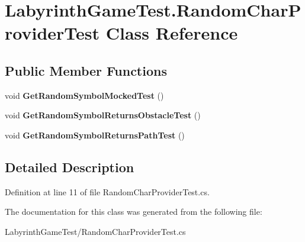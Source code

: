 \hypertarget{class_labyrinth_game_test_1_1_random_char_provider_test}{\section{Labyrinth\+Game\+Test.\+Random\+Char\+Provider\+Test Class Reference}
\label{class_labyrinth_game_test_1_1_random_char_provider_test}
}
\subsection*{Public Member Functions}
\begin{DoxyCompactItemize}
\item 
\hypertarget{class_labyrinth_game_test_1_1_random_char_provider_test_ae3c37381f1e88bb204c252bc4d61c98e}{void {\bfseries Get\+Random\+Symbol\+Mocked\+Test} ()}\label{class_labyrinth_game_test_1_1_random_char_provider_test_ae3c37381f1e88bb204c252bc4d61c98e}

\item 
\hypertarget{class_labyrinth_game_test_1_1_random_char_provider_test_a4b3beecdafebbced77fb01116b023750}{void {\bfseries Get\+Random\+Symbol\+Returns\+Obstacle\+Test} ()}\label{class_labyrinth_game_test_1_1_random_char_provider_test_a4b3beecdafebbced77fb01116b023750}

\item 
\hypertarget{class_labyrinth_game_test_1_1_random_char_provider_test_a28dafef4f81ce5d13f0bc36ac7350bdb}{void {\bfseries Get\+Random\+Symbol\+Returns\+Path\+Test} ()}\label{class_labyrinth_game_test_1_1_random_char_provider_test_a28dafef4f81ce5d13f0bc36ac7350bdb}

\end{DoxyCompactItemize}


\subsection{Detailed Description}


Definition at line 11 of file Random\+Char\+Provider\+Test.\+cs.



The documentation for this class was generated from the following file\+:\begin{DoxyCompactItemize}
\item 
Labyrinth\+Game\+Test/Random\+Char\+Provider\+Test.\+cs\end{DoxyCompactItemize}

